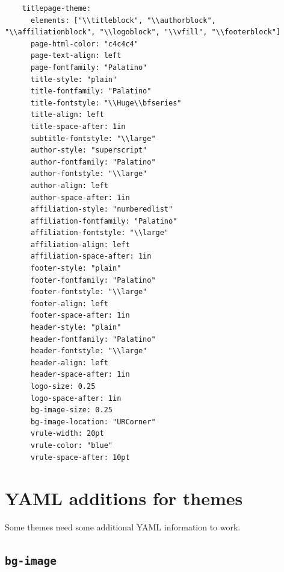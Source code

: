 \documentclass[
  oneside,
  open=any]{scrbook}
\begin{document}
\begin{verbatim}
    titlepage-theme: 
      elements: ["\\titleblock", "\\authorblock", "\\affiliationblock", "\\logoblock", "\\vfill", "\\footerblock"]
      page-html-color: "c4c4c4"
      page-text-align: left
      page-fontfamily: "Palatino"
      title-style: "plain"
      title-fontfamily: "Palatino"
      title-fontstyle: "\\Huge\\bfseries"
      title-align: left
      title-space-after: 1in
      subtitle-fontstyle: "\\large"
      author-style: "superscript"
      author-fontfamily: "Palatino"
      author-fontstyle: "\\large"
      author-align: left
      author-space-after: 1in
      affiliation-style: "numberedlist"
      affiliation-fontfamily: "Palatino"
      affiliation-fontstyle: "\\large"
      affiliation-align: left
      affiliation-space-after: 1in
      footer-style: "plain"
      footer-fontfamily: "Palatino"
      footer-fontstyle: "\\large"
      footer-align: left
      footer-space-after: 1in
      header-style: "plain"
      header-fontfamily: "Palatino"
      header-fontstyle: "\\large"
      header-align: left
      header-space-after: 1in
      logo-size: 0.25
      logo-space-after: 1in
      bg-image-size: 0.25
      bg-image-location: "URCorner"
      vrule-width: 20pt
      vrule-color: "blue"
      vrule-space-after: 10pt
\end{verbatim}

\hypertarget{yaml-additions-for-themes}{%
\section{YAML additions for themes}\label{yaml-additions-for-themes}}

Some themes need some additional YAML information to work.

\hypertarget{bg-image}{%
\subsection{\texorpdfstring{\texttt{bg-image}}{bg-image}}\label{bg-image}}
\end{document}
